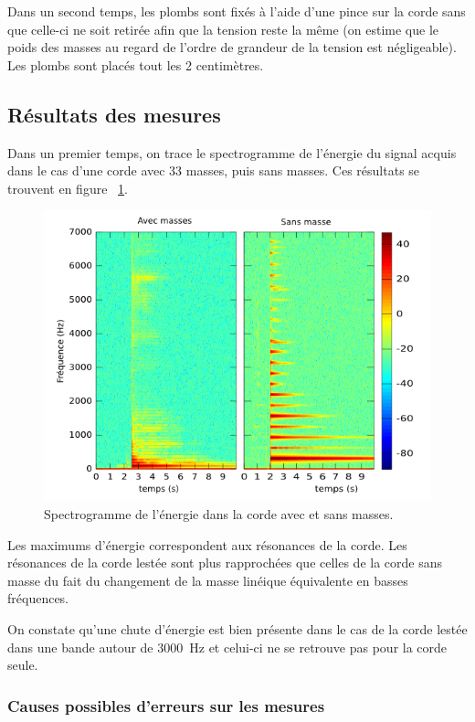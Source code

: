 \documentclass[a4paper,11pt]{report} %
\begin{document}
\bigskip
Dans un second temps, les plombs sont fixés à l'aide d'une pince sur la corde sans que celle-ci ne soit retirée afin que la tension reste la même (on estime que le poids des masses au regard de l'ordre de grandeur de la tension est négligeable). Les plombs sont placés tout les 2 centimètres.

\subsection{Résultats des mesures}
Dans un premier temps, on trace le spectrogramme de l'énergie du signal acquis dans le cas d'une corde avec 33 masses, puis sans masses. Ces résultats se trouvent en figure ~\ref{spectro}.

\begin{figure}[!h]\centering
\includegraphics[scale=0.7]{./figures/spectrogram_nue.png}
\caption{Spectrogramme de l'énergie dans la corde avec et sans masses.}
\label{spectro}
\end{figure} 

Les maximums d'énergie correspondent aux résonances de la corde. Les résonances de la corde lestée sont plus rapprochées que celles de la corde sans masse du fait du changement de la masse linéique équivalente en basses fréquences.


On constate qu'une chute d'énergie est bien présente dans le cas de la corde lestée dans une bande autour de 3000~Hz et celui-ci ne se retrouve pas pour la corde seule.


\subsubsection{Causes possibles d'erreurs sur les mesures}
\end{document}
